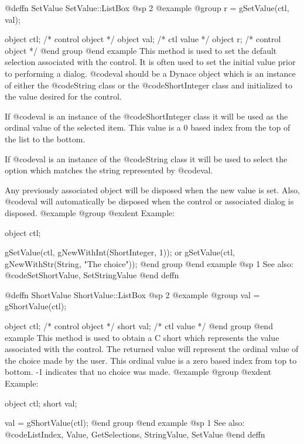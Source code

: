 @deffn {SetValue} SetValue::ListBox
@sp 2
@example
@group
r = gSetValue(ctl, val);

object  ctl;    /*  control object  */
object  val;    /*  ctl value       */
object  r;      /*  control object  */
@end group
@end example
This method is used to set the default selection associated with the
control.  It is often used to set the initial value prior to performing
a dialog.  @code{val} should be a Dynace object which is an instance of
either the @code{String} class or the @code{ShortInteger} class and
initialized to the value desired for the control.

If @code{val} is an instance of the @code{ShortInteger} class it will be
used as the ordinal value of the selected item.  This value is a 0 based
index from the top of the list to the bottom.

If @code{val} is an instance of the @code{String} class it will be used
to select the option which matches the string represented by @code{val}.

Any previously associated object will be disposed when the new value is set.
Also, @code{val} will automatically be disposed when the control or associated
dialog is disposed.
@example
@group
@exdent Example:

object  ctl;

gSetValue(ctl, gNewWithInt(ShortInteger, 1));
        or
gSetValue(ctl, gNewWithStr(String, "The choice"));
@end group
@end example
@sp 1
See also:  @code{SetShortValue, SetStringValue}
@end deffn













@deffn {ShortValue} ShortValue::ListBox
@sp 2
@example
@group
val = gShortValue(ctl);

object  ctl;   /*  control object  */
short   val;   /*  ctl value       */
@end group
@end example
This method is used to obtain a C short which represents the value
associated with the control.  The returned value will represent the
ordinal value of the choice made by the user.  This ordinal value is a
zero based index from top to bottom.  -1 indicates that no choice was
made.
@example
@group
@exdent Example:

object  ctl;
short   val;

val = gShortValue(ctl);
@end group
@end example
@sp 1
See also:  @code{ListIndex, Value, GetSelections, StringValue, SetValue}
@end deffn










